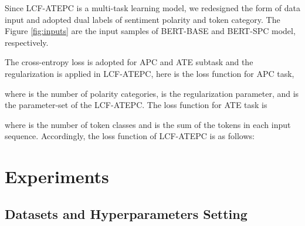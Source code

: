\documentclass[a4paper,fleqn]{cas-sc}
\begin{document}
Since LCF-ATEPC is a multi-task learning model, we redesigned the form of data input and adopted dual labels of sentiment polarity and token category. The Figure \ref{fig:inputs} are the input samples of BERT-BASE and BERT-SPC model, respectively. 

\begin{figure*}[pos=th]
	\centering
	
	\caption{ \ref{fig:input} is he input sequence formatted for the BERT-BASE model. The first line is composed of the aspect term labels; The second and third lines are the input sequence after tokenization and polarity label, respectively. \ref{fig:input1} represent the sample input sequence formatted for BERT-SPC model and the aspects in two position are labeled simultaneously. \ref{fig:input2} depicts a sample of Chinese sequence input format for BERT-SPC model.}
	\label{fig:inputs}
\end{figure*}


The cross-entropy loss is adopted for APC and ATE subtask and the  regularization is applied in LCF-ATEPC, here is the loss function for APC task,

where  is the number of polarity categories,  is the  regularization parameter, and  is the parameter-set of the LCF-ATEPC. The loss function for ATE task is 

where  is the number of token classes and  is the sum of the tokens in each input sequence. Accordingly, the loss function of LCF-ATEPC is as follows:



\section{Experiments}

\subsection{Datasets and Hyperparameters Setting}
\end{document}
